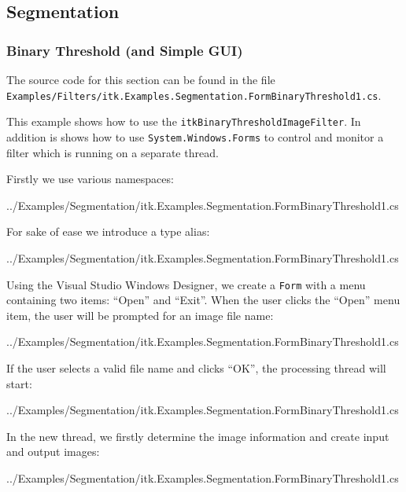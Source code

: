 \documentclass{InsightArticle}
\def\code#1{\texttt{#1}}
\begin{document}
\subsection{Segmentation}

\subsubsection{Binary Threshold (and Simple GUI)}
\label{sec:Examples:BinaryThreshold1}
The source code for this section can be found in the file\\
\code{Examples/Filters/itk.Examples.Segmentation.FormBinaryThreshold1.cs}.

This example shows how to use the \code{itkBinaryThresholdImageFilter}.
In addition is shows how to use \code{System.Windows.Forms} to control and
monitor a filter which is running on a separate thread.

Firstly we use various namespaces:
\begin{center}
	
	{../Examples/Segmentation/itk.Examples.Segmentation.FormBinaryThreshold1.cs}
\end{center}

For sake of ease we introduce a type alias:
\begin{center}
	
	{../Examples/Segmentation/itk.Examples.Segmentation.FormBinaryThreshold1.cs}
\end{center}

Using the Visual Studio Windows Designer, we create a \code{Form} with a 
menu containing two items: ``Open'' and ``Exit''. When the user clicks the 
``Open'' menu item, the user will be prompted for an image file name:
\begin{center}
	
	{../Examples/Segmentation/itk.Examples.Segmentation.FormBinaryThreshold1.cs}
\end{center}

If the user selects a valid file name and clicks ``OK'', the processing thread will start:
\begin{center}
	
	{../Examples/Segmentation/itk.Examples.Segmentation.FormBinaryThreshold1.cs}
\end{center}

In the new thread, we firstly determine the image information and create
input and output images:
\begin{center}
	
	{../Examples/Segmentation/itk.Examples.Segmentation.FormBinaryThreshold1.cs}
\end{center}
\end{document}
